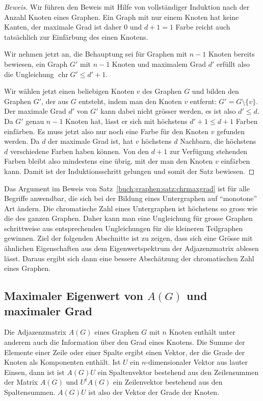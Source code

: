 \begin{proof}[Beweis]
Wir führen den Beweis mit Hilfe von vollständiger Induktion nach der
Anzahl Knoten eines Graphen.
Ein Graph mit nur einem Knoten hat keine Kanten, der maximale Grad ist
daher $0$ und $d+1=1$ Farbe reicht auch tatsächlich zur Einfärbung des
einen Knotens.

Wir nehmen jetzt an, die Behauptung sei für Graphen mit $n-1$ Knoten bereits
bewiesen, ein Graph $G'$ mit $n-1$ Knoten und maximalem Grad $d'$ erfüllt
also die Ungleichung $\operatorname{chr}G'\le d'+1$.

Wir wählen jetzt einen beliebigen Knoten $v$ des Graphen $G$ und bilden
den Graphen $G'$, der aus $G$ entsteht, indem man den Knoten $v$
entfernt: $G'=G\setminus\{v\}$.
Der maximale Grad $d'$ von $G'$ kann dabei nicht grösser werden, es ist
also $d'\le d$.
Da $G'$ genau $n-1$ Knoten hat, lässt er sich mit höchstens $d'+1\le d+1$
Farben einfärben.
Es muss jetzt also nur noch eine Farbe für den Knoten $v$ gefunden werden.
Da $d$ der maximale Grad ist, hat $v$ höchstens $d$ Nachbarn, die höchstens
$d$ verschiedene Farben haben können.
Von den $d+1$ zur Verfügung stehenden Farben bleibt also mindestens eine
übrig, mit der man den Knoten $v$ einfärben kann.
Damit ist der Induktionsschritt gelungen und somit der Satz bewiesen.
\end{proof}

Das Argument im Beweis von Satz~\ref{buch:graphen:satz:chrmaxgrad}
ist für alle Begriffe anwendbar, die sich bei der Bildung eines 
Untergraphen auf ``monotone'' Art ändern.
Die chromatische Zahl eines Untergraphen ist höchstens so gross wie die
des ganzen Graphen. 
Daher kann man eine Ungleichung für grosse Graphen schrittweise aus
entsprechenden Ungleichungen für die kleineren Teilgraphen gewinnen.
Ziel der folgenden Abschnitte ist zu zeigen, dass sich eine Grösse
mit ähnlichen Eigenschaften aus dem Eigenwertspektrum der Adjazenzmatrix
ablesen lässt.
Daraus ergibt sich dann eine bessere Abschätzung der chromatischen Zahl
eines Graphen.

%
%
\subsection{Maximaler Eigenwert von $A(G)$ und maximaler Grad
\label{buch:subsection:maximaler-eigenwert}}
Die Adjazenzmatrix $A(G)$ eines Graphen $G$  mit $n$ Knoten enthält unter
anderem auch die Information über den Grad eines Knotens.
Die Summe der Elemente einer Zeile oder einer Spalte ergibt einen Vektor,
der die Grade der Knoten als Komponenten enthält.
Ist $U$ ein $n$-dimensionaler Vektor aus lauter Einsen, dann ist
ist $A(G)U$ ein Spaltenvektor bestehend aus den Zeilensummen der Matrix 
$A(G)$ und
$U^tA(G)$ ein Zeilenvektor bestehend aus den Spaltensummen.
$A(G)U$ ist also der Vektor der Grade der Knoten.

